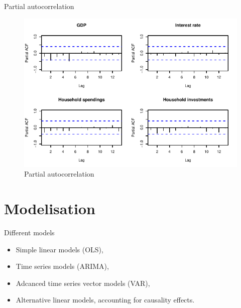 \documentclass[11pt,ignorenonframetext,]{beamer}
\providecommand{\tightlist}{%
  \setlength{\itemsep}{0pt}\setlength{\parskip}{0pt}}
\begin{document}
\begin{frame}{Partial autocorrelation}
\protect\hypertarget{partial-autocorrelation}{}

\FloatBarrier

\tiny

\begin{figure}[!htbp]

{\centering \includegraphics{presentation_files/figure-beamer/unnamed-chunk-26-1} 

}

\caption{Partial autocorrelation}\label{fig:unnamed-chunk-26}
\end{figure}

\normalsize

\FloatBarrier

\end{frame}

\hypertarget{modelisation}{%
\section{Modelisation}\label{modelisation}}

\begin{frame}{Different models}
\protect\hypertarget{different-models}{}

\begin{itemize}
\tightlist
\item
  Simple linear models (OLS),
\item
  Time series models (ARIMA),
\item
  Adcanced time series vector models (VAR),
\item
  Alternative linear models, accounting for causality effects.
\end{itemize}

\end{frame}
\end{document}
